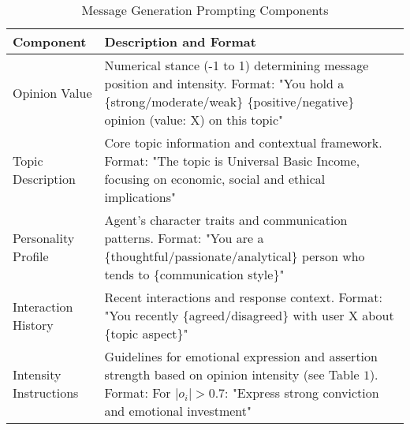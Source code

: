 \begin{table*}[h!]
\centering
\small
\caption{Message Generation Prompting Components}
\label{tab:prompt-components}
\begin{tabularx}{\textwidth}{lX}
\toprule
\textbf{Component} & \textbf{Description and Format} \\
\midrule
Opinion Value & Numerical stance (-1 to 1) determining message position and intensity. Format: "You hold a \{strong/moderate/weak\} \{positive/negative\} opinion (value: X) on this topic" \\
\midrule
Topic Description & Core topic information and contextual framework. Format: "The topic is Universal Basic Income, focusing on economic, social and ethical implications" \\
\midrule
Personality Profile & Agent's character traits and communication patterns. Format: "You are a \{thoughtful/passionate/analytical\} person who tends to \{communication style\}" \\
\midrule
Interaction History & Recent interactions and response context. Format: "You recently \{agreed/disagreed\} with user X about \{topic aspect\}" \\
\midrule
Intensity Instructions & Guidelines for emotional expression and assertion strength based on opinion intensity (see Table $1$). Format: For $|o_i| > 0.7$: "Express strong conviction and emotional investment" \\
\bottomrule
\end{tabularx}
\end{table*}